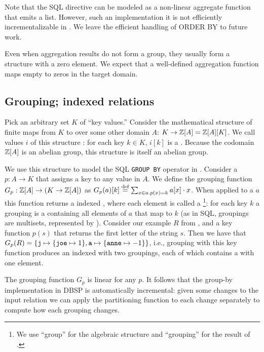 Note that the SQL  directive can be modeled as
a non-linear aggregate function that emits a list.  However, such an implementation it is not efficiently incrementalizable in \dbsp. 
We leave the efficient handling of ORDER BY to future work.

Even when aggregation results do not form a group, they usually form
a structure with a zero element.  We expect that a well-defined
aggregation function maps empty \zrs to zeros in the target domain.

\subsection{Grouping; indexed relations}\label{sec:grouping}

Pick an arbitrary set $K$ of ``key values.''
Consider the mathematical structure of finite maps from $K$ 
to \zrs over some other domain $A$: $K \to \mathbb{Z}[A] = \mathbb{Z}[A][K]$.
We call values $i$ of this structure : for
each key $k \in K$, $i[k]$ is a \zr.  Because 
the codomain $\mathbb{Z}[A]$ is an abelian group, this structure is itself 
an abelian group.

We use this structure to model the SQL \texttt{GROUP BY} operator in \dbsp.  
Consider a 
$p: A \to K$ that assigns a key to any value in $A$.  We define the grouping function
$G_p: \mathbb{Z}[A] \to (K \to \mathbb{Z}[A])$ as $G_p(a)[k] \stackrel{\textrm{\scriptsize def}}{=} \sum_{x \in a.p(x)=k}a[x] \cdot x$.
When applied to a \zr $a$ this function returns a indexed \zr, where each element 
is called a \footnote{We use
``group'' for the algebraic structure and ``grouping'' for the result of .}: for each key $k$ a 
grouping is a \zr containing all elements of $a$ that map to $k$ 
(as in SQL, groupings are multisets, represented by \zrs).
Consider our example \zr $R$ from ,
and a key function $p(s)$ that returns the first letter of the string 
$s$. Then we have that $G_p(R) = \{ \mbox{\texttt{j}} \mapsto \{ \mbox{\texttt{joe}} 
\mapsto 1 \}, \mbox{\texttt{a}} \mapsto \{ \mbox{\texttt{anne}} \mapsto -1 \} \}$,
i.e., grouping with this key function produces an indexed \zr with two groupings, each 
of which contains a \zr with one element.

The grouping function $G_p$ is linear for any $p$.
It follows that the group-by implementation in DBSP is automatically
incremental: given some changes
to the input relation we can apply the partitioning function
to each change separately to compute how each grouping changes.

